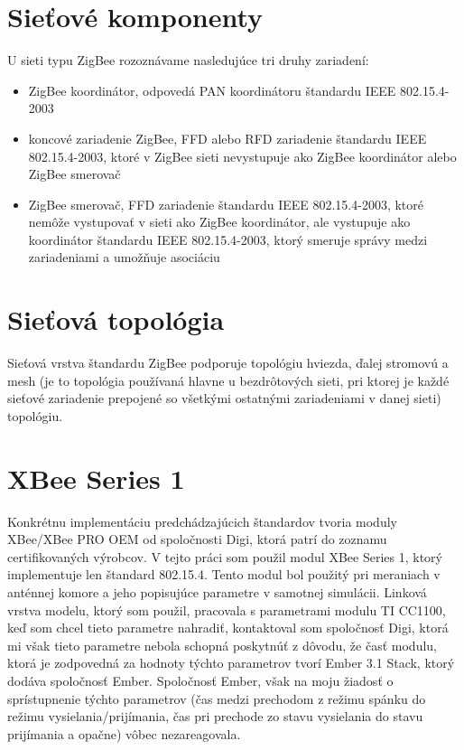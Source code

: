 \documentclass[11pt,twoside,a4paper]{book}
\begin{document}
\section{Sieťové komponenty}
U sieti typu ZigBee rozoznávame nasledujúce tri druhy zariadení:
\begin{itemize}
\item ZigBee koordinátor, odpovedá PAN koordinátoru štandardu IEEE 802.15.4-2003
\item koncové zariadenie ZigBee, FFD alebo RFD zariadenie štandardu IEEE 802.15.4-2003, ktoré v ZigBee sieti nevystupuje ako ZigBee koordinátor alebo ZigBee smerovač
\item ZigBee smerovač, FFD zariadenie štandardu IEEE 802.15.4-2003, ktoré nemôže vystupovať v sieti ako ZigBee koordinátor, ale vystupuje ako koordinátor štandardu IEEE 802.15.4-2003, ktorý smeruje správy medzi zariadeniami a umožňuje asociáciu
\end{itemize}

\section{Sieťová topológia}
Sieťová vrstva štandardu ZigBee podporuje topológiu hviezda, ďalej stromovú a mesh (je to topológia používaná hlavne u bezdrôtových sieti, pri ktorej je každé sieťové zariadenie prepojené so všetkými ostatnými zariadeniami v danej sieti) topológiu.

\section{XBee Series 1}
Konkrétnu implementáciu predchádzajúcich štandardov tvoria moduly XBee/XBee PRO OEM od spoločnosti Digi, ktorá patrí do zoznamu certifikovaných výrobcov. V tejto práci som použil modul XBee Series 1, ktorý implementuje len štandard 802.15.4. Tento modul bol použitý pri meraniach v anténnej komore a jeho popisujúce parametre v samotnej simulácii. Linková vrstva modelu, ktorý som použil, pracovala s parametrami modulu TI CC1100, keď som chcel tieto parametre nahradiť, kontaktoval som spoločnosť Digi, ktorá mi však tieto parametre nebola schopná poskytnúť z dôvodu, že časť modulu, ktorá je zodpovedná za hodnoty týchto parametrov tvorí Ember 3.1 Stack, ktorý dodáva spoločnosť Ember. Spoločnosť Ember, však na moju žiadosť o sprístupnenie týchto parametrov (čas medzi prechodom z režimu spánku do režimu vysielania/prijímania, čas pri prechode zo stavu vysielania do stavu prijímania a opačne) vôbec nezareagovala.
\end{document}
